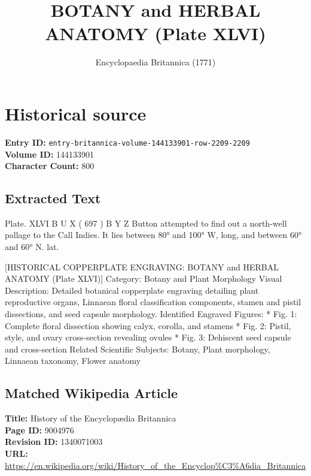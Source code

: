 \documentclass{article}
\title{BOTANY and HERBAL ANATOMY (Plate XLVI)}
\date{Encyclopaedia Britannica (1771)}
\begin{document}
\maketitle

\section*{Historical source}
\textbf{Entry ID:} \texttt{entry-britannica-volume-144133901-row-2209-2209} \\
\textbf{Volume ID:} 144133901 \\
\textbf{Character Count:} 800

\subsection*{Extracted Text}
Plate. XLVI B U X ( 697 ) B Y Z Button attempted to find out a north-well pallage to the Call Indies. It lies between 80° and 100° W, long, and between 60° and 60° N. lat.

[HISTORICAL COPPERPLATE ENGRAVING: BOTANY and HERBAL ANATOMY (Plate XLVI)]
Category: Botany and Plant Morphology
Visual Description: Detailed botanical copperplate engraving detailing plant reproductive organs, Linnaean floral classification components, stamen and pistil dissections, and seed capsule morphology.
Identified Engraved Figures:
  * Fig. 1: Complete floral dissection showing calyx, corolla, and stamens
  * Fig. 2: Pistil, style, and ovary cross-section revealing ovules
  * Fig. 3: Dehiscent seed capsule and cross-section
Related Scientific Subjects: Botany, Plant morphology, Linnaean taxonomy, Flower anatomy

\subsection*{Matched Wikipedia Article}
\textbf{Title:} History of the Encyclopædia Britannica \\
\textbf{Page ID:} 9004976 \\
\textbf{Revision ID:} 1340071003 \\
\textbf{URL:} \url{https://en.wikipedia.org/wiki/History\_of\_the\_Encyclop\%C3\%A6dia\_Britannica}
\end{document}
